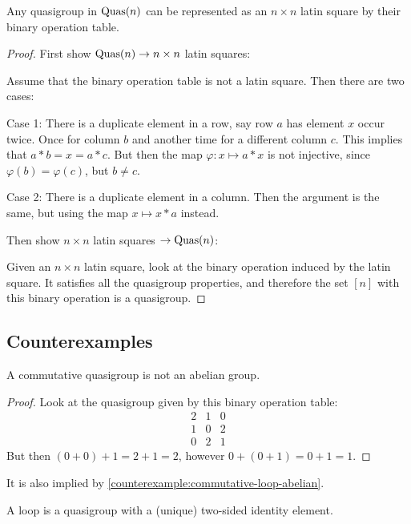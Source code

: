 \begin{theorem} \label{thm:latin-square-property}
    Any quasigroup in \( \operatorname{Quas}(n) \) can be represented as an \( n \times n \) latin square by their binary operation table.
\end{theorem}
\begin{proof}
    First show \( \operatorname{Quas}(n) \to n \times n \) latin squares:

    Assume that the binary operation table is not a latin square. Then there are two cases:

    Case 1: There is a duplicate element in a row, say row \( a \) has element \( x \) occur twice. Once for column \( b \) and another time for a different column \( c \). This implies that \( a * b = x = a * c \). But then the map \( \varphi: x \mapsto a * x \) is not injective, since \( \varphi(b) = \varphi(c) \), but \( b \neq c \).

    Case 2: There is a duplicate element in a column. Then the argument is the same, but using the map \( x \mapsto x * a \) instead.

    Then show \( n \times n \) latin squares \( \to \operatorname{Quas}(n) \):

    Given an \( n \times n \) latin square, look at the binary operation induced by the latin square. It satisfies all the quasigroup properties, and therefore the set \( [n] \) with this binary operation is a quasigroup.
\end{proof}

\subsection{Counterexamples}

\begin{counterexample}
    A commutative quasigroup is not an abelian group.
\end{counterexample}
\begin{proof}
    Look at the quasigroup given by this binary operation table:
    \[
        \begin{matrix}
            2 & 1 & 0 \\
            1 & 0 & 2 \\
            0 & 2 & 1
        \end{matrix}
    \]
    But then \( (0 + 0) + 1 = 2 + 1 = 2 \), however \( 0 + (0 + 1) = 0 + 1 = 1 \).
\end{proof}
It is also implied by \autoref{counterexample:commutative-loop-abelian}.

\begin{definition} \label{def:loop}
    A loop is a quasigroup with a (unique) two-sided identity element.
\end{definition}

